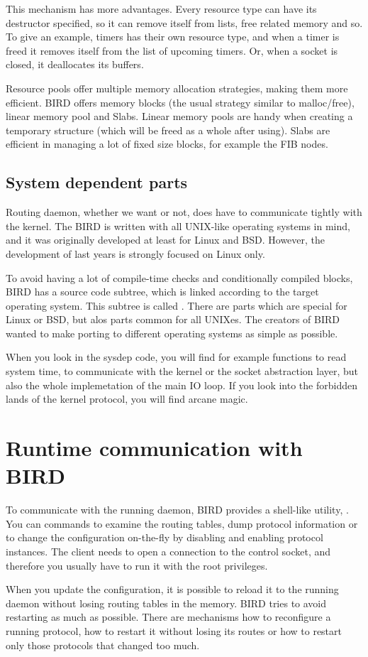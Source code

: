 This mechanism has more advantages. Every resource type can have its destructor
specified, so it can remove itself from lists, free related memory and so. To
give an example, timers has their own resource type, and when a timer is freed
it removes itself from the list of upcoming timers. Or, when a socket is
closed, it deallocates its buffers.

Resource pools offer multiple memory allocation strategies, making them more
efficient. BIRD offers memory blocks (the usual strategy similar to
malloc/free), linear memory pool and Slabs. Linear memory pools are handy when
creating a temporary structure (which will be freed as a whole after using).
Slabs are efficient in managing a lot of fixed size blocks, for example the FIB
nodes.

\subsection{System dependent parts}
Routing daemon, whether we want or not, does have to communicate tightly with
the kernel. The BIRD is written with all UNIX-like operating systems in mind,
and it was originally developed at least for Linux and BSD. However, the
development of last years is strongly focused on Linux only.

To avoid having a lot of compile-time checks and conditionally compiled blocks,
BIRD has a source code subtree, which is linked according to the target
operating system. This subtree is called . There are parts which
are special for Linux or BSD, but alos parts common for all UNIXes. The
creators of BIRD wanted to make porting to different operating systems as
simple as possible.

When you look in the sysdep code, you will find for example functions to read
system time, to communicate with the kernel or the socket abstraction layer,
but also the whole implemetation of the main IO loop. If you look into the
forbidden lands of the kernel protocol, you will find arcane magic.

\section{Runtime communication with BIRD}
To communicate with the running daemon, BIRD provides a shell-like utility,
. You can commands to examine the routing tables, dump protocol
information or to change the configuration on-the-fly by disabling and enabling
protocol instances. The client needs to open a connection to the control
socket, and therefore you usually have to run it with the root privileges.

When you update the configuration, it is possible to reload it to the running
daemon without losing routing tables in the memory. BIRD tries to avoid
restarting as much as possible. There are mechanisms how to reconfigure
a running protocol, how to restart it without losing its routes or how to
restart only those protocols that changed too much.



